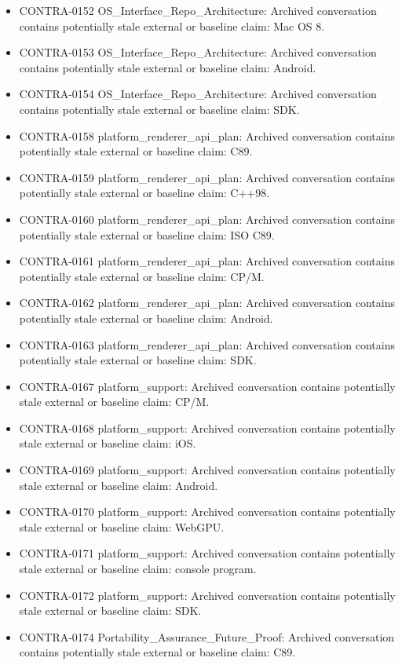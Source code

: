 \documentclass[11pt,a4paper]{report}
\begin{document}
\begin{itemize}
\item CONTRA-0152 OS\_Interface\_Repo\_Architecture: Archived conversation contains potentially stale external or baseline claim: Mac OS 8.
\item CONTRA-0153 OS\_Interface\_Repo\_Architecture: Archived conversation contains potentially stale external or baseline claim: Android.
\item CONTRA-0154 OS\_Interface\_Repo\_Architecture: Archived conversation contains potentially stale external or baseline claim: SDK.
\item CONTRA-0158 platform\_renderer\_api\_plan: Archived conversation contains potentially stale external or baseline claim: C89.
\item CONTRA-0159 platform\_renderer\_api\_plan: Archived conversation contains potentially stale external or baseline claim: C++98.
\item CONTRA-0160 platform\_renderer\_api\_plan: Archived conversation contains potentially stale external or baseline claim: ISO C89.
\item CONTRA-0161 platform\_renderer\_api\_plan: Archived conversation contains potentially stale external or baseline claim: CP/M.
\item CONTRA-0162 platform\_renderer\_api\_plan: Archived conversation contains potentially stale external or baseline claim: Android.
\item CONTRA-0163 platform\_renderer\_api\_plan: Archived conversation contains potentially stale external or baseline claim: SDK.
\item CONTRA-0167 platform\_support: Archived conversation contains potentially stale external or baseline claim: CP/M.
\item CONTRA-0168 platform\_support: Archived conversation contains potentially stale external or baseline claim: iOS.
\item CONTRA-0169 platform\_support: Archived conversation contains potentially stale external or baseline claim: Android.
\item CONTRA-0170 platform\_support: Archived conversation contains potentially stale external or baseline claim: WebGPU.
\item CONTRA-0171 platform\_support: Archived conversation contains potentially stale external or baseline claim: console program.
\item CONTRA-0172 platform\_support: Archived conversation contains potentially stale external or baseline claim: SDK.
\item CONTRA-0174 Portability\_Assurance\_Future\_Proof: Archived conversation contains potentially stale external or baseline claim: C89.

\end{itemize}
\end{document}
